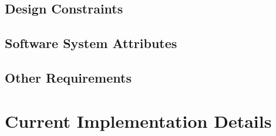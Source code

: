 \documentclass[11pt]{article}
\theoremstyle{definition}
\begin{document}
\subsection{Design Constraints}\label{sec:constraints}

\subsection{Software System Attributes}\label{sec:sw_sys_attr}

\subsection{Other Requirements}\label{sec:other_req}

\section{Current Implementation Details}\label{sec:impl}


\printbibliography
\end{document}

